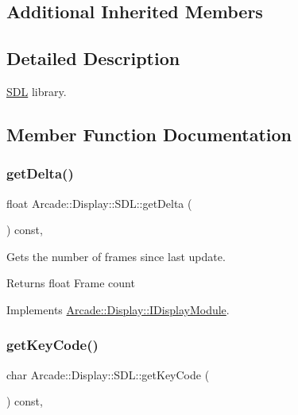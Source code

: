 \subsection*{Additional Inherited Members}


\subsection{Detailed Description}
\mbox{\hyperlink{classArcade_1_1Display_1_1SDL}{S\+DL}} library. 

\subsection{Member Function Documentation}
\mbox{\label{classArcade_1_1Display_1_1SDL_a1ca09d130dea3bec2481eb72a49c0f03}} 
\subsubsection{\texorpdfstring{getDelta()}{getDelta()}}
{\footnotesize\ttfamily float Arcade\+::\+Display\+::\+S\+D\+L\+::get\+Delta (\begin{DoxyParamCaption}{ }\end{DoxyParamCaption}) const\hspace{0.3cm}{\ttfamily [final]}, {\ttfamily [virtual]}}



Gets the number of frames since last update. 

\begin{DoxyReturn}{Returns}
float Frame count 
\end{DoxyReturn}


Implements \mbox{\hyperlink{classArcade_1_1Display_1_1IDisplayModule_aab078d82e6fdd32682553947c20226ac}{Arcade\+::\+Display\+::\+I\+Display\+Module}}.

\mbox{\label{classArcade_1_1Display_1_1SDL_a3ba94b49b72c9e189f52af7b97f4ad91}} 
\subsubsection{\texorpdfstring{getKeyCode()}{getKeyCode()}}
{\footnotesize\ttfamily char Arcade\+::\+Display\+::\+S\+D\+L\+::get\+Key\+Code (\begin{DoxyParamCaption}{ }\end{DoxyParamCaption}) const\hspace{0.3cm}{\ttfamily [final]}, {\ttfamily [virtual]}}



